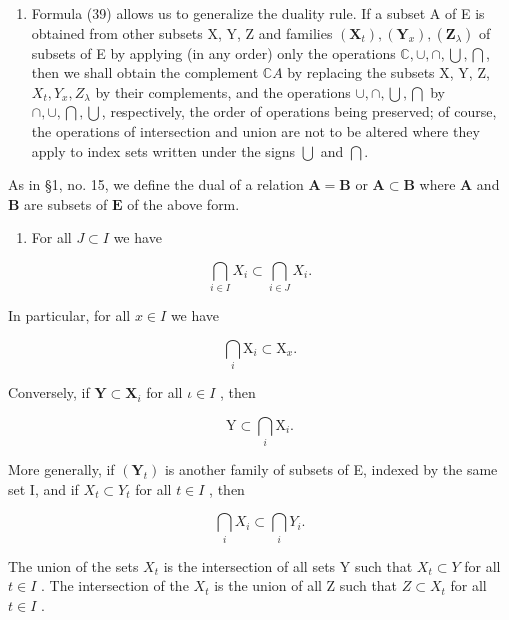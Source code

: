 \begin{enumerate}
\def\labelenumi{\arabic{enumi}.}
\setcounter{enumi}{6}
\tightlist
\item
  Formula (39) allows us to generalize the duality rule. If a subset A of E is obtained from other subsets X, Y, Z and families \((\mathbf{X}_{t}), (\mathbf{Y}_{x}), (\mathbf{Z}_{\lambda})\) of subsets of E by applying (in any order) only the operations \(\mathbb C, \cup, \cap, \bigcup, \bigcap\), then we shall obtain the complement \(\mathbb C A\) by replacing the subsets X, Y, Z, \(X_{t}, Y_{x}, Z_{\lambda}\) by their complements, and the operations \(\cup, \cap, \bigcup, \bigcap\) by \(\cap, \cup, \bigcap, \bigcup\), respectively, the order of operations being preserved; of course, the operations of intersection and union are not to be altered where they apply to index sets written under the signs \(\bigcup\) and \(\bigcap\).
\end{enumerate}

As in §1, no. 15, we define the dual of a relation \(\mathbf{A} = \mathbf{B}\) or \(\mathbf{A} \subset \mathbf{B}\) where \(\mathbf{A}\) and \(\mathbf{B}\) are subsets of \(\mathbf{E}\) of the above form.

\begin{enumerate}
\def\labelenumi{\arabic{enumi}.}
\setcounter{enumi}{7}
\tightlist
\item
  For all \(J \subset I\) we have
\end{enumerate}

\[
\bigcap_ {i \in I} X _ {i} \subset \bigcap_ {i \in J} X _ {i}.
\]

In particular, for all \(x \in I\) we have

\[
\bigcap_ {i} \mathrm{X} _ {i} \subset \mathrm{X} _ {x}.
\]

Conversely, if \(\mathbf{Y} \subset \mathbf{X}_i\) for all \(\iota \in I\) , then

\[
\mathrm{Y} \subset \bigcap_ {i} \mathrm{X} _ {i}.
\]

More generally, if \((\mathbf{Y}_{t})\) is another family of subsets of E, indexed by the same set I, and if \(X_{t} \subset Y_{t}\) for all \(t \in I\) , then

\[
\bigcap_ {i} X _ {i} \subset \bigcap_ {i} Y _ {i}.
\]

The union of the sets \(X_{t}\) is the intersection of all sets Y such that \(X_{t} \subset Y\) for all \(t \in I\) . The intersection of the \(X_{t}\) is the union of all Z such that \(Z \subset X_{t}\) for all \(t \in I\) .

